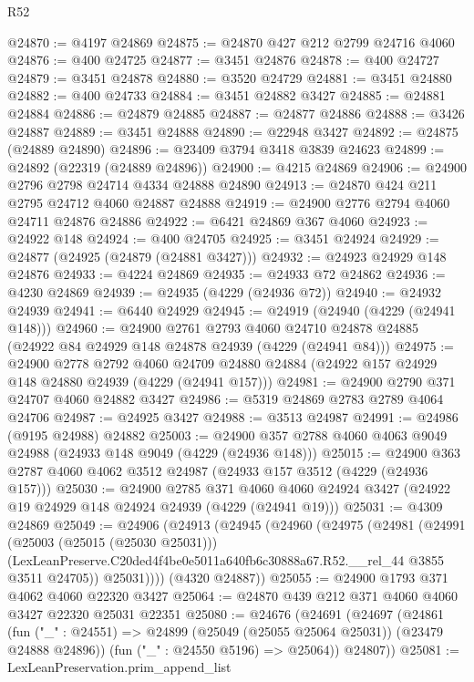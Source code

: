 \begin{lexlean}{R52}
\begin{coremodule}
@24870 := @4197 @24869
@24875 := @24870 @427 @212 @2799 @24716 @4060
@24876 := @400 @24725
@24877 := @3451 @24876
@24878 := @400 @24727
@24879 := @3451 @24878
@24880 := @3520 @24729
@24881 := @3451 @24880
@24882 := @400 @24733
@24884 := @3451 @24882 @3427
@24885 := @24881 @24884
@24886 := @24879 @24885
@24887 := @24877 @24886
@24888 := @3426 @24887
@24889 := @3451 @24888
@24890 := @22948 @3427
@24892 := @24875 (@24889 @24890)
@24896 := @23409 @3794 @3418 @3839 @24623
@24899 := @24892 (@22319 (@24889 @24896))
@24900 := @4215 @24869
@24906 := @24900 @2796 @2798 @24714 @4334 @24888 @24890
@24913 := @24870 @424 @211 @2795 @24712 @4060 @24887 @24888
@24919 := @24900 @2776 @2794 @4060 @24711 @24876 @24886
@24922 := @6421 @24869 @367 @4060
@24923 := @24922 @148
@24924 := @400 @24705
@24925 := @3451 @24924
@24929 := @24877 (@24925 (@24879 (@24881 @3427)))
@24932 := @24923 @24929 @148 @24876
@24933 := @4224 @24869
@24935 := @24933 @72 @24862
@24936 := @4230 @24869
@24939 := @24935 (@4229 (@24936 @72))
@24940 := @24932 @24939
@24941 := @6440 @24929
@24945 := @24919 (@24940 (@4229 (@24941 @148)))
@24960 := @24900
    @2761
    @2793
    @4060
    @24710
    @24878
    @24885
    (@24922 @84 @24929 @148 @24878 @24939 (@4229 (@24941 @84)))
@24975 := @24900
    @2778
    @2792
    @4060
    @24709
    @24880
    @24884
    (@24922 @157 @24929 @148 @24880 @24939 (@4229 (@24941 @157)))
@24981 := @24900 @2790 @371 @24707 @4060 @24882 @3427
@24986 := @5319 @24869 @2783 @2789 @4064 @24706
@24987 := @24925 @3427
@24988 := @3513 @24987
@24991 := @24986 (@9195 @24988) @24882
@25003 := @24900 @357 @2788 @4060 @4063 @9049 @24988 (@24933 @148 @9049 (@4229 (@24936 @148)))
@25015 := @24900 @363 @2787 @4060 @4062 @3512 @24987 (@24933 @157 @3512 (@4229 (@24936 @157)))
@25030 := @24900
    @2785
    @371
    @4060
    @4060
    @24924
    @3427
    (@24922 @19 @24929 @148 @24924 @24939 (@4229 (@24941 @19)))
@25031 := @4309 @24869
@25049 := @24906
    (@24913
      (@24945
        (@24960
          (@24975
            (@24981
              (@24991
                (@25003 (@25015 (@25030 @25031)))
                (LexLeanPreserve.C20ded4f4be0e5011a640fb6c30888a67.R52.__rel_44 @3855 @3511 @24705))
              @25031))))
      (@4320 @24887))
@25055 := @24900 @1793 @371 @4062 @4060 @22320 @3427
@25064 := @24870 @439 @212 @371 @4060 @4060 @3427 @22320 @25031 @22351
@25080 := @24676
    (@24691
      (@24697
        (@24861
          (fun ("_" : @24551) => @24899 (@25049 (@25055 @25064 @25031)) (@23479 @24888 @24896))
          (fun ("_" : @24550 @5196) => @25064))
        @24807))
@25081 := LexLeanPreservation.prim_append_list

\end{coremodule}
\end{lexlean}
